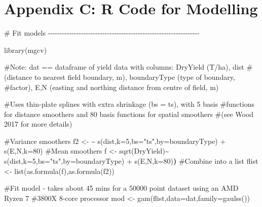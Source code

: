 \documentclass[]{elsarticle} %
\newenvironment{Shaded}{}{}
\newcommand{\AttributeTok}[1]{#1}
\newcommand{\CommentTok}[1]{\textcolor[rgb]{0.00,0.50,0.00}{#1}}
\newcommand{\ErrorTok}[1]{\textcolor[rgb]{1.00,0.00,0.00}{\textbf{#1}}}
\newcommand{\FunctionTok}[1]{#1}
\newcommand{\NormalTok}[1]{#1}
\newcommand{\OtherTok}[1]{\textcolor[rgb]{1.00,0.25,0.00}{#1}}
\newcommand{\StringTok}[1]{\textcolor[rgb]{0.00,0.50,0.50}{#1}}
\begin{document}
\newpage

\hypertarget{appendix-c-r-code-for-modelling}{%
\section*{Appendix C: R Code for Modelling}\label{appendix-c-r-code-for-modelling}}

\begin{Shaded}
\begin{Highlighting}[]
\CommentTok{\# Fit models {-}{-}{-}{-}{-}{-}{-}{-}{-}{-}{-}{-}{-}{-}{-}{-}{-}{-}{-}{-}{-}{-}{-}{-}{-}{-}{-}{-}{-}{-}{-}{-}{-}{-}{-}{-}{-}{-}{-}{-}{-}{-}{-}{-}{-}{-}{-}{-}{-}{-}{-}{-}{-}{-}{-}{-}{-}{-}{-}{-}{-}{-}{-}{-}}

\FunctionTok{library}\NormalTok{(mgcv)}

\CommentTok{\#Note: dat == dataframe of yield data with columns: DryYield (T/ha), dist}
\CommentTok{\#(distance to nearest field boundary, m), boundaryType (type of boundary,}
\CommentTok{\#factor), E,N (easting and northing distance from centre of field, m)}

\CommentTok{\#Uses thin{-}plate splines with extra shrinkage (bs = \textquotesingle{}ts\textquotesingle{}), with 5 basis}
\CommentTok{\#functions for distance smoothers and 80 basis functions for spatial smoothers}
\CommentTok{\#(see Wood 2017 for more details)}

\CommentTok{\#Variance smoothers}
\NormalTok{f2 }\OtherTok{\textless{}{-}} \StringTok{\textquotesingle{}\textasciitilde{} s(dist,k=5,bs="ts",by=boundaryType) + s(E,N,k=80)\textquotesingle{}} 
\CommentTok{\#Mean smoothers}
\NormalTok{f }\OtherTok{\textless{}{-}} \StringTok{\textquotesingle{}sqrt(DryYield)\textasciitilde{} s(dist,k=5,bs="ts",by=boundaryType) + s(E,N,k=80)\textquotesingle{}}\ErrorTok{)} 
\CommentTok{\#Combine into a list}
\NormalTok{flist }\OtherTok{\textless{}{-}} \FunctionTok{list}\NormalTok{(}\FunctionTok{as.formula}\NormalTok{(f),}\FunctionTok{as.formula}\NormalTok{(f2)) }

\CommentTok{\#Fit model {-} takes about 45 mins for a 50000 point dataset using an AMD Ryzen 7}
\CommentTok{\#3800X 8{-}core processor}
\NormalTok{mod }\OtherTok{\textless{}{-}} \FunctionTok{gam}\NormalTok{(flist,}\AttributeTok{data=}\NormalTok{dat,}\AttributeTok{family=}\FunctionTok{gaulss}\NormalTok{()) }
\end{Highlighting}
\end{Shaded}
\end{document}
